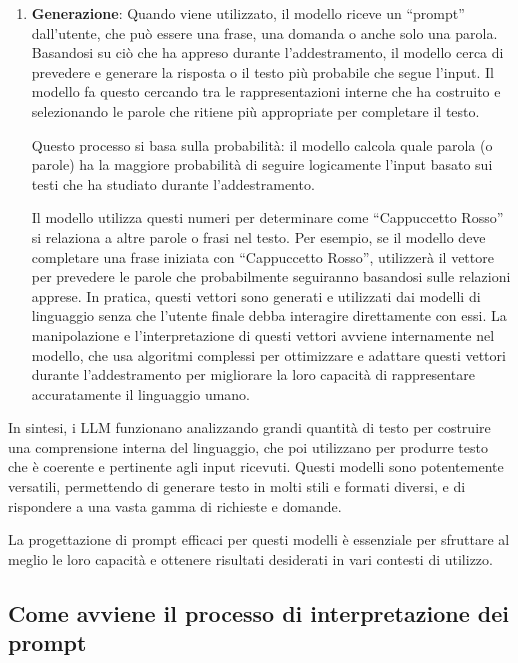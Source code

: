 \begin{enumerate}
                \item
                    \textbf{Generazione}: Quando viene utilizzato, il modello riceve un ``prompt'' dall'utente, che può essere una frase, una domanda o anche solo una parola. Basandosi su ciò che ha appreso durante l'addestramento, il modello cerca di prevedere e generare la risposta o il testo più probabile che segue l'input. Il modello fa questo cercando tra le rappresentazioni interne che ha costruito e selezionando le parole che ritiene più appropriate per completare il testo.  
            
                    Questo processo si basa sulla probabilità: il modello calcola quale parola (o parole) ha la maggiore probabilità di seguire logicamente l'input basato sui testi che ha studiato durante l'addestramento.  
                    
                    Il modello utilizza questi numeri per determinare come ``Cappuccetto Rosso'' si relaziona a altre parole o frasi nel testo. Per esempio, se il modello deve completare una frase iniziata con ``Cappuccetto Rosso'', utilizzerà il vettore per prevedere le parole che probabilmente seguiranno basandosi sulle relazioni apprese. In pratica, questi vettori sono generati e utilizzati dai modelli di linguaggio senza che l'utente finale debba interagire direttamente con essi. La manipolazione e l'interpretazione di questi vettori avviene internamente nel modello, che usa algoritmi complessi per ottimizzare e adattare questi vettori durante l'addestramento per migliorare la loro capacità di rappresentare accuratamente il linguaggio umano. 
            \end{enumerate}
            
            In sintesi, i LLM funzionano analizzando grandi quantità di testo per costruire una comprensione interna del linguaggio, che poi utilizzano per produrre testo che è coerente e pertinente agli input ricevuti. Questi modelli sono potentemente versatili, permettendo di generare testo in molti stili e formati diversi, e di rispondere a una vasta gamma di richieste e domande. 
            
            La progettazione di prompt efficaci per questi modelli è essenziale per sfruttare al meglio le loro capacità e ottenere risultati desiderati in vari contesti di utilizzo. 
            
    \subsection{Come avviene il processo di interpretazione dei prompt}
        
